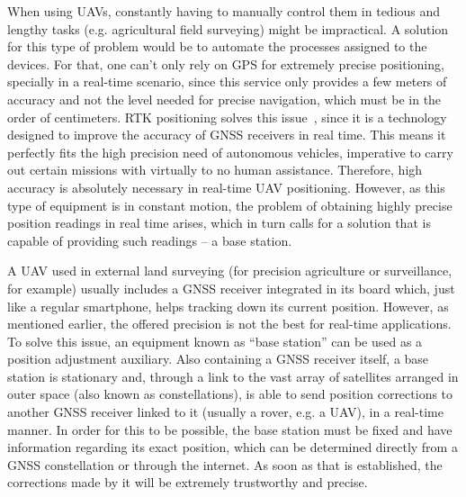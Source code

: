 When using UAVs, constantly having to manually control them in tedious and lengthy tasks (e.g. agricultural field surveying) might be impractical.
A solution for this type of problem would be to automate the processes assigned to the devices. For that, one can't only rely on GPS for extremely precise positioning, specially in a real-time scenario, since this service only provides a few meters of accuracy and not the level needed for precise navigation, which must be in the order of centimeters. \gls{RTK} positioning solves this issue~\cite{gps_USGov,8714161},
since it is a technology designed to improve the accuracy of \gls{GNSS} receivers in real time. This means it perfectly fits the high precision need of autonomous vehicles, imperative to carry out certain missions with virtually to no human assistance. Therefore, high accuracy is absolutely necessary in real-time UAV positioning.
However, as this type of equipment is in constant motion, the problem of obtaining highly precise position readings in real time arises, which in turn calls for a solution that is capable of providing such readings -- a base station.

A UAV used in external land surveying (for precision agriculture or surveillance, for example) usually includes a GNSS receiver integrated in its board which, just like a regular smartphone, helps tracking down its current position.
However, as mentioned earlier, the offered precision is not the best for real-time applications.
To solve this issue, an equipment known as ``base station'' can be used as a position adjustment auxiliary.
Also containing a GNSS receiver itself, a base station is stationary and, through a link to the vast array of satellites arranged in outer space (also known as constellations), is able to send position corrections to another GNSS receiver linked to it (usually a rover, e.g. a UAV), in a real-time manner.
In order for this to be possible, the base station must be fixed and have information regarding its exact position, which can be determined directly from a GNSS constellation or through the internet.
As soon as that is established, the corrections made by it will be extremely trustworthy and precise.


